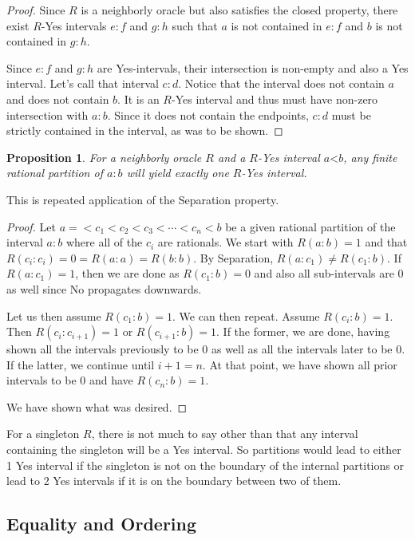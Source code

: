 \documentclass[12pt]{article}
\newtheorem{proposition}{Proposition}
\theoremstyle{remark}
\newcommand{\lt}{\mathord{<}}
\begin{document}
\begin{proof}
Since $R$ is a neighborly oracle but also satisfies the closed property, there exist $R$-Yes intervals $e:f$ and $g:h$ such that $a$ is not contained in $e:f$ and $b$ is not contained in $g:h$. 

Since $e:f$ and $g:h$ are Yes-intervals, their intersection is non-empty and also a Yes interval. Let's call that interval $c:d$.  Notice that the interval does not contain $a$ and does not contain $b$. It is an $R$-Yes interval and thus must have non-zero intersection with $a:b$. Since it does not contain the endpoints, $c:d$ must be strictly contained in the interval, as was to be shown. 
\end{proof}

\begin{proposition}\label{pr:multi}
For a neighborly oracle $R$ and a $R$-Yes interval $a\lt b$, any finite rational partition of $a:b$ will yield exactly one $R$-Yes interval. 
\end{proposition}

This is repeated application of the Separation property. 

\begin{proof}
Let $a= < c_1 < c_2 < c_3 < \cdots < c_n < b$ be a given rational partition of the interval $a:b$ where all of the $c_i$ are rationals. We start with $R(a:b) = 1$ and that $R(c_i:c_i) = 0 = R(a:a) = R(b:b)$. By Separation, $R(a:c_1) \neq R(c_1:b)$. If $R(a:c_1)=1$, then we are done as $R(c_1:b)=0$ and also all sub-intervals are 0 as well since No propagates downwards. 

Let us then assume $R(c_1:b)=1$. We can then repeat. Assume $R(c_i:b)=1$. Then $R(c_i:c_{i+1})=1$ or $R(c_{i+1}:b)=1$. If the former, we are done, having shown all the intervals previously to be 0 as well as all the intervals later to be 0.  If the latter, we continue until $i+1 = n$. At that point, we have shown all prior intervals to be 0 and have $R(c_n:b) = 1$. 

We have shown what was desired. 
\end{proof}

For a singleton $R$, there is not much to say other than that any interval containing the singleton will be a Yes interval. So partitions would lead to either 1 Yes interval if the singleton is not on the boundary of the internal partitions or lead to 2 Yes intervals if it is on the boundary between two of them. 

\subsection{Equality and Ordering}
\end{document}
